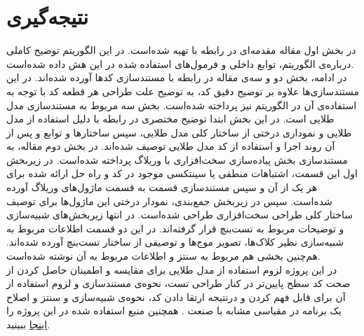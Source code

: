 \chapter{نتیجه‌گیری}


در بخش اول مقاله مقدمه‌ای در رابطه با  تهیه شده‌است. در این الگوریتم توضیح کاملی درباره‌ی الگوریتم، توابع داخلی و فرمول‌های استفاده شده در این هش داده شده‌است.  \\
در ادامه، بخش دو و سه‌ی مقاله در رابطه با مستندسازی کدها آورده شده‌اند. در این مستندساز‌ی‌ها علاوه بر توضیح دقیق کد، به توضیح علت طراحی هر قطعه کد با توجه به استفاده‌ی آن در الگوریتم   نیز پرداخته شده‌است. بخش سه مربوط به مستندسازی مدل طلایی است. در این بخش ابتدا توضیح مختصری در رابطه با دلیل استفاده از مدل طلایی و نموداری درختی از ساختار کلی مدل طلایی، سپس ساختارها و توابع و پس از آن روند اجرا و استفاده از کد مدل طلایی توصیف شده‌اند. در بخش دوم مقاله،‌ به مستندسازی بخش پیاده‌سازی سخت‌افزاری با وریلاگ پرداخته شده‌است. در زیربخش اول این قسمت،  اشتباهات منطقی یا سینتکسی موجود در کد و راه حل ارائه شده برای هر یک از آن و سپس مستندسازی قسمت به قسمت ماژول‌های وریلاگ آورده‌ شده‌است.‌ سپس در زیربخش جمع‌بندی، نمودار درختی این ماژول‌ها برای توصیف ساختار کلی طراحی سخت‌افزاری طراحی شده‌است. در انتها زیربخش‌های شبیه‌سازی و توضیحات مربوط به تست‌بنچ قرار گرفته‌اند. در این دو قسمت اطلاعات مربوط به شبیه‌سازی نظیر کلاک‌ها، تصویر موج‌ها و توصیفی از ساختار تست‌بنچ آورده شده‌اند. هم‌چنین بخشی هم مربوط به سنتز و اطلاعات مربوط به آن نوشته شده‌است. \\
در این‌ پروژه لزوم استفاده از مدل طلایی برای مقایسه‌ و اطمینان حاصل کردن از صحت کد سطح پایین‌تر در کنار طراحی تست، نحوه‌ی مستندسازی و لزوم استفاده از آن برای قابل فهم کردن  و درنتیجه ارتقا دادن کد، نحوه‌ی شبیه‌سازی و سنتز و اصلاح یک برنامه در مقیاسی مشابه با صنعت .
همچنین منبع استفاده شده در این پروژه را \hyperref[manba]{اینجا} ببینید.

